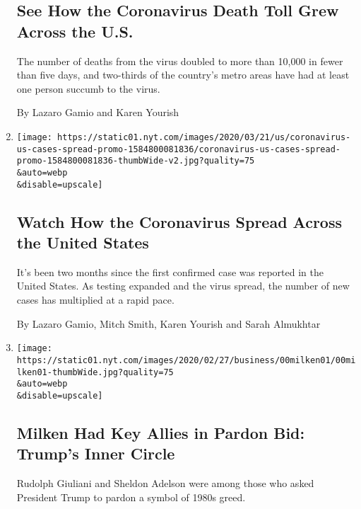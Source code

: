 \begin{enumerate}
  \hypertarget{see-how-the-coronavirus-death-toll-grew-across-the-us}{%
  \subsection{See How the Coronavirus Death Toll Grew Across the
  U.S.}\label{see-how-the-coronavirus-death-toll-grew-across-the-us}}

  The number of deaths from the virus doubled to more than 10,000 in
  fewer than five days, and two-thirds of the country's metro areas have
  had at least one person succumb to the virus.

  By Lazaro Gamio and Karen Yourish
\item
  \href{/interactive/2020/03/21/us/coronavirus-us-cases-spread.html}{}

  \texttt{[image: https://static01.nyt.com/images/2020/03/21/us/coronavirus-us-cases-spread-promo-1584800081836/coronavirus-us-cases-spread-promo-1584800081836-thumbWide-v2.jpg?quality=75\\\&auto=webp\\\&disable=upscale]}

  \hypertarget{watch-how-the-coronavirus-spread-across-the-united-states}{%
  \subsection{Watch How the Coronavirus Spread Across the United
  States}\label{watch-how-the-coronavirus-spread-across-the-united-states}}

  It's been two months since the first confirmed case was reported in
  the United States. As testing expanded and the virus spread, the
  number of new cases has multiplied at a rapid pace.

  By Lazaro Gamio, Mitch Smith, Karen Yourish and Sarah Almukhtar
\item
  \href{/2020/03/01/business/michael-milken-trump-pardon.html}{}

  \texttt{[image: https://static01.nyt.com/images/2020/02/27/business/00milken01/00milken01-thumbWide.jpg?quality=75\\\&auto=webp\\\&disable=upscale]}

  \hypertarget{milken-had-key-allies-in-pardon-bid-trumps-inner-circle}{%
  \subsection{Milken Had Key Allies in Pardon Bid: Trump's Inner
  Circle}\label{milken-had-key-allies-in-pardon-bid-trumps-inner-circle}}

  Rudolph Giuliani and Sheldon Adelson were among those who asked
  President Trump to pardon a symbol of 1980s greed.


\end{enumerate}
